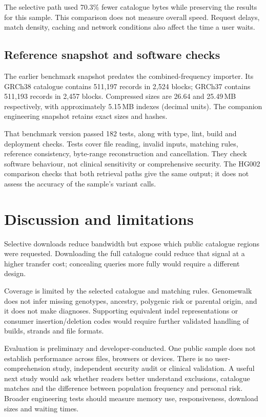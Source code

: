 \documentclass[10pt,twocolumn,letterpaper]{article}
\begin{document}
The selective path used 70.3\% fewer catalogue bytes while preserving the results for this sample. This comparison does not measure overall speed. Request delays, match density, caching and network conditions also affect the time a user waits.

\subsection{Reference snapshot and software checks}
The earlier benchmark snapshot predates the combined-frequency importer. Its GRCh38 catalogue contains 511,197 records in 2,524 blocks; GRCh37 contains 511,193 records in 2,457 blocks. Compressed sizes are 26.64 and 25.49\,MB respectively, with approximately 5.15\,MB indexes (decimal units). The companion engineering snapshot retains exact sizes and hashes.

That benchmark version passed 182 tests, along with type, lint, build and deployment checks. Tests cover file reading, invalid inputs, matching rules, reference consistency, byte-range reconstruction and cancellation. They check software behaviour, not clinical sensitivity or comprehensive security. The HG002 comparison checks that both retrieval paths give the same output; it does not assess the accuracy of the sample's variant calls.

\section{Discussion and limitations}
Selective downloads reduce bandwidth but expose which public catalogue regions were requested. Downloading the full catalogue could reduce that signal at a higher transfer cost; concealing queries more fully would require a different design.

Coverage is limited by the selected catalogue and matching rules. Genomewalk does not infer missing genotypes, ancestry, polygenic risk or parental origin, and it does not make diagnoses. Supporting equivalent indel representations or consumer insertion/deletion codes would require further validated handling of builds, strands and file formats.

Evaluation is preliminary and developer-conducted. One public sample does not establish performance across files, browsers or devices. There is no user-comprehension study, independent security audit or clinical validation. A useful next study would ask whether readers better understand exclusions, catalogue matches and the difference between population frequency and personal risk. Broader engineering tests should measure memory use, responsiveness, download sizes and waiting times.
\end{document}
